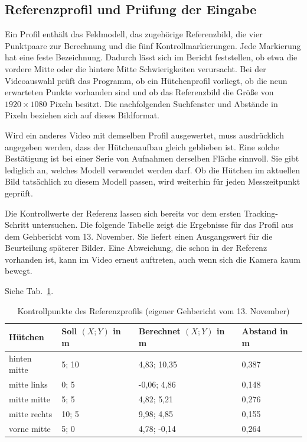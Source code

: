 \subsection{Referenzprofil und Prüfung der Eingabe}
Ein Profil enthält das Feldmodell, das zugehörige Referenzbild, die vier Punktpaare zur Berechnung und die fünf Kontrollmarkierungen. Jede Markierung hat eine feste Bezeichnung. Dadurch lässt sich im Bericht feststellen, ob etwa die vordere Mitte oder die hintere Mitte Schwierigkeiten verursacht. Bei der Videoauswahl prüft das Programm, ob ein Hütchenprofil vorliegt, ob die neun erwarteten Punkte vorhanden sind und ob das Referenzbild die Größe von $1920\times1080$ Pixeln besitzt. Die nachfolgenden Suchfenster und Abstände in Pixeln beziehen sich auf dieses Bildformat.

Wird ein anderes Video mit demselben Profil ausgewertet, muss ausdrücklich angegeben werden, dass der Hütchenaufbau gleich geblieben ist. Eine solche Bestätigung ist bei einer Serie von Aufnahmen derselben Fläche sinnvoll. Sie gibt lediglich an, welches Modell verwendet werden darf. Ob die Hütchen im aktuellen Bild tatsächlich zu diesem Modell passen, wird weiterhin für jeden Messzeitpunkt geprüft.

Die Kontrollwerte der Referenz lassen sich bereits vor dem ersten Tracking-Schritt untersuchen. Die folgende Tabelle zeigt die Ergebnisse für das Profil aus dem Gehbericht vom 13. November. Sie liefert einen Ausgangswert für die Beurteilung späterer Bilder. Eine Abweichung, die schon in der Referenz vorhanden ist, kann im Video erneut auftreten, auch wenn sich die Kamera kaum bewegt.

Siehe Tab.~\ref{tab:em-referenz}.
\begin{table}[htbp]\centering\caption{Kontrollpunkte des Referenzprofils (eigener Gehbericht vom 13. November)}\label{tab:em-referenz}
\begin{tabular}{@{}llll@{}}\toprule Hütchen & Soll $(X;Y)$ in m & Berechnet $(X;Y)$ in m & Abstand in m\\\midrule
hinten mitte & 5; 10 & 4,83; 10,35 & 0,387\\
mitte links & 0; 5 & -0,06; 4,86 & 0,148\\
mitte mitte & 5; 5 & 4,82; 5,21 & 0,276\\
mitte rechts & 10; 5 & 9,98; 4,85 & 0,155\\
vorne mitte & 5; 0 & 4,78; -0,14 & 0,264\\\bottomrule\end{tabular}\end{table}

